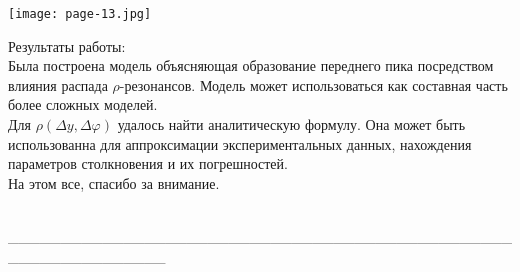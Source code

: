 \documentclass[12pt]{article}
\renewcommand{\phi}{\varphi}
\def\Dphi{\Delta\phi}
\def\Dy{\Delta y}
\renewcommand{\line}{\\ \_\_\_\_\_\_\_\_\_\_\_\_\_\_\_\_\_\_\_\_\_\_\_\_\_\_\_\_\_\_\_\_\_\_\_\_\_\_\_\_\_\_\_\_\_\_\_\_\_\_\_\_\_\_\_\_\_\_\_\_\_\_\_ \\ }
\begin{document}
\begin{minipage}[h]{0.29\linewidth}
	\texttt{[image: page-13.jpg]}
\end{minipage}
\begin{minipage}[h]{0.7\linewidth}
	Результаты работы: \\
	\qquad Была построена модель объясняющая образование переднего пика посредством влияния распада $\rho$-резонансов. Модель может использоваться как составная часть более сложных моделей. \\
	\qquad Для  $\rho (\Dy, \Dphi)$ удалось найти аналитическую формулу. Она может быть использованна для аппроксимации экспериментальных данных, нахождения параметров столкновения и их погрешностей. \\
	На этом все, спасибо за внимание.
\end{minipage}
\line
\end{document}

